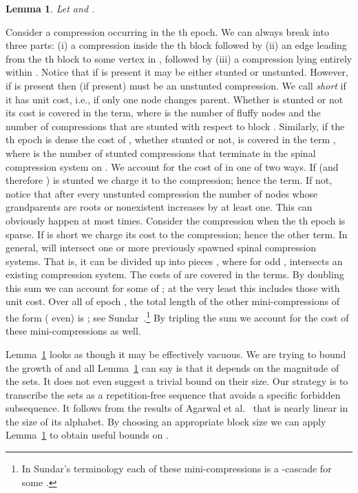 \documentclass{article}
\newenvironment{proof}{\noindent {\bf Proof:}}{\hfill}
\newtheorem{lemma}[theorem]{Lemma}
\begin{document}
\begin{lemma}\label{lem:rec-a}
Let  and .

\end{lemma}

\begin{proof}
Consider a compression  occurring in the th epoch.  
We can always break  into three parts: (i) a compression  inside the th block
followed by (ii) an edge  leading from the th block to some vertex in , followed
by (iii) a compression  lying entirely within .  Notice that if  is present it may be
either stunted or unstunted.  
However, if  is present then  (if present) must be an unstunted compression.
We call  {\em short} if it has unit cost, i.e., if only one node changes parent.
Whether  is stunted or not its cost is covered in the  term, 
where  is the number of fluffy nodes and  the
number of compressions that are stunted with respect to block .  
Similarly, if the th epoch is dense the cost of , whether stunted or not, is covered in the term
, where  is the number of stunted compressions that terminate in 
the spinal compression system on .  We account for the cost of  in one of two ways.  If  (and therefore )
is stunted we charge it to the compression; hence the  term.  If not, notice that after every unstunted compression 
the number of nodes whose grandparents are roots or nonexistent increases by at least one.  This can obviously happen
at most  times.
Consider the compression  when the th epoch is sparse.  If  is short we charge its cost to the compression; hence the other  term.
In general,  will intersect one or more previously spawned spinal compression systems.  That is, it can be divided up
into pieces , where for odd ,  intersects an existing compression system.
The costs of  are covered in the  terms.
By doubling this sum we can account for some of ; at the very least this includes those with unit cost.
Over all of epoch , the total length of the other mini-compressions of the form  ( even)
is ;  see Sundar~\cite{Sundar92}.\footnote{In Sundar's terminology each of these mini-compressions is a -cascade for some .}
By tripling the sum  we account for the cost of these mini-compressions as well.
\end{proof}

Lemma~\ref{lem:rec-a} looks as though it may be effectively vacuous.
We are trying to bound the growth of  and all Lemma~\ref{lem:rec-a} can say 
is that it depends on the magnitude of the  sets.  It does not even suggest a trivial
bound on their size.   Our strategy is to transcribe the  sets as a repetition-free
sequence  that avoids a specific forbidden subsequence.  It follows from the results of Agarwal et al.~\cite{ASS89}
that  is nearly linear in the size of its alphabet.
By choosing an appropriate block size  we can apply Lemma~\ref{lem:rec-a} to obtain useful bounds on .
\end{document}
